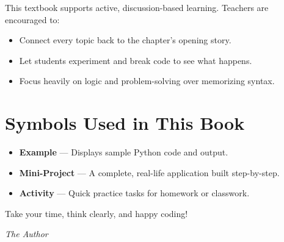 This textbook supports active, discussion-based learning. Teachers are encouraged to:
\begin{itemize}
    \item Connect every topic back to the chapter's opening story.
    \item Let students experiment and break code to see what happens.
    \item Focus heavily on logic and problem-solving over memorizing syntax.
\end{itemize}

\section*{Symbols Used in This Book}

\begin{itemize}
    \item \textbf{Example} — Displays sample Python code and output.
    \item \textbf{Mini-Project} — A complete, real-life application built step-by-step.
    \item \textbf{Activity} — Quick practice tasks for homework or classwork.
\end{itemize}

Take your time, think clearly, and happy coding!

\vfill
\begin{flushright}
\textit{The Author}
\end{flushright}